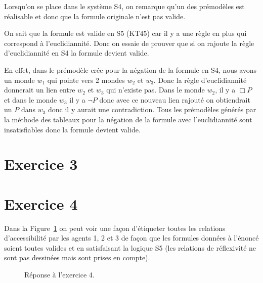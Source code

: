 \documentclass[a4paper,11pt]{amsart}
\theoremstyle{plain}
\begin{document}
Lorsqu'on se place dans le système S4, on remarque qu'un des prémodèles est réalisable et donc que la formule originale n'est pas valide.

On sait que la formule est valide en S5 (KT45) car il y a une règle en plus qui correspond à l'euclidiannité. Donc on essaie de prouver que si on rajoute la règle d'euclidiannité en S4 la formule devient valide.

En effet, dans le prémodèle crée pour la négation de la formule en S4, nous avons un monde $w_1$ qui pointe vers 2 mondes $w_2$ et $w_3$. Donc la règle d'euclidiannité donnerait un lien entre $w_2$ et $w_3$ qui n'existe pas. Dans le monde $w_2$, il y a $\Box P$ et dans le monde $w_3$ il y a $\lnot P$ donc avec ce nouveau lien rajouté on obtiendrait un $P$ dans $w_3$ donc il y aurait une contradiction. Tous les prémodèles générés par la méthode des tableaux pour la négation de la formule avec l'euclidiannité sont insatisfiables donc la formule devient valide.

\section*{Exercice 3}

\section*{Exercice 4}

Dans la Figure~\ref{FigModele} on peut voir une façon d'étiqueter toutes les relations d'accessibilité par les agents 1, 2 et 3 de façon que les formules données à l'énoncé soient toutes valides et en satisfaisant la logique S5 (les relations de réflexivité ne sont pas dessinées mais sont prises en compte).

\begin{figure}[ht]
\centering
{}
\caption{Réponse à l'exercice 4.}
\label{FigModele}
\end{figure}
\end{document}
